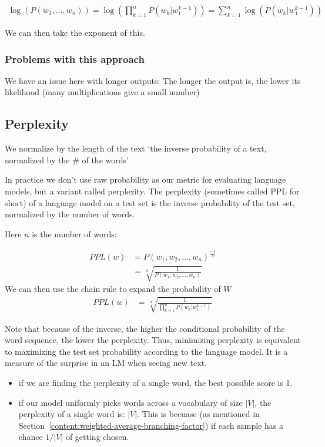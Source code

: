 \documentclass[11pt]{article}
\begin{document}
\begin{align*}
    \log(P(w_1, \ldots, w_n)) = \log(\prod^n_{k=1}P(w_k|w_1^{k-1})) = \sum^n_{k=1}\log(P(w_k|w_1^{k-1}))
\end{align*}

We can then take the exponent of this.

\subsubsection{Problems with this approach}

We have an issue here with longer outputs: The longer the output is, the lower its likelihood (many multiplications give a small number)

\subsection{Perplexity}

We normalize by the length of the text `the inverse probability of a text, normalized by the \# of the words'

\begin{definition}[Perplexity]
    In practice we don't use raw probability as our metric for evaluating language models, but a variant called perplexity. The perplexity (sometimes called PPL for short) of a language model on a test set is the inverse probability of the test set, normalized by the number of words.
\end{definition}

Here $n$ is the number of words:

\begin{align*}
    PPL(w) & =P(w_1,w_2,\ldots,w_n)^\frac{-1}{N} \\
    & = \sqrt[n]{\frac{1}{P(w_1,w_2,\ldots,w_n)}}
\end{align*}
We can then use the chain rule to expand the probability of $W$
\begin{align*}
    PPL(w) & =  \sqrt[n]{\frac{1}{\prod^n_{k=1}P(w_k|w_1^{k-1})}}
\end{align*}

Note that because of the inverse, the higher the conditional probability of the word sequence, the lower the perplexity. Thus, minimizing perplexity is equivalent to maximizing the test set probability according to the language model. It is a measure of the surprise in an LM when seeing new text.

\begin{itemize}
    \item if we are finding the perplexity of a single word, the best possible score is 1.
    \item if our model uniformly picks words across a vocabulary of size $|V|$, the perplexity of a single word is: $|V|$. This is becuase (as mentioned in Section~\ref{content:weighted-average-branching-factor}) if each sample has a chance $1/|V|$ of getting chosen.
\end{itemize}
\end{document}
